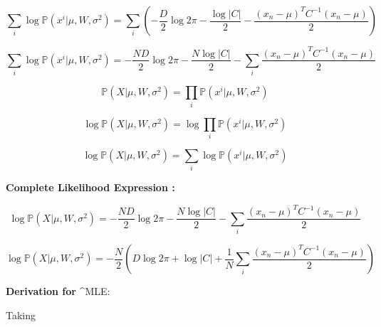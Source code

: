 \documentclass[a4paper,11pt]{article}
\begin{document}
\begin{mlsolution}
\[
\sum_i \log\mathbb{P}(x^i | \mu, W, \sigma^2) = 
\sum_i \left (
-\frac{D}{2}\log2\pi - \frac{\log|C|}{2}   -\frac{(x_n - \mu)^TC^{-1}(x_n - \mu)}{2} \right )
\]

\[
\sum_i \log\mathbb{P}(x^i | \mu, W, \sigma^2) = 
-\frac{ND}{2}\log2\pi - \frac{N\log|C|}{2} - \sum_i\frac{(x_n - \mu)^TC^{-1}(x_n - \mu)}{2}
\]

\[
\mathbb{P}(X | \mu, W, \sigma^2) = \prod_i\mathbb{P}(x^i | \mu, W, \sigma^2) 
\]

\[
\log \mathbb{P}(X | \mu, W, \sigma^2) = \log \prod_i\mathbb{P}(x^i | \mu, W, \sigma^2) 
\]

\[
\log \mathbb{P}(X | \mu, W, \sigma^2) = \sum_i \log \mathbb{P}(x^i | \mu, W, \sigma^2) 
\]

\textbf{Complete Likelihood Expression : }

\[
\log \mathbb{P}(X | \mu, W, \sigma^2) =-\frac{ND}{2}\log2\pi - \frac{N\log|C|}{2} - \sum_i\frac{(x_n - \mu)^TC^{-1}(x_n - \mu)}{2}
\]

\[
\log \mathbb{P}(X | \mu, W, \sigma^2) =-\frac{N}{2} \left ( D\log2\pi + \log|C| + \frac{1}{N}\sum_i\frac{(x_n - \mu)^TC^{-1}(x_n - \mu)}{2} \right )
\]

\textbf{Derivation for } \textbf{\mu}^{MLE}:

Taking 

\end{mlsolution}
\end{document}

